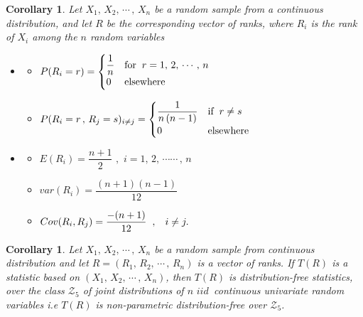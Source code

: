 \documentclass[12pt,a4paper]{report}
\theoremstyle{definition}
\theoremstyle{plain}
\newtheorem{coro}[thm]{Corollary}
\begin{document}
\begin{coro}
Let $X_1, \, X_2, \, \cdots\, , \, X_n$ be a random sample from a continuous distribution, and let $R$ be the corresponding vector of ranks, where $R_i$ is the rank of $X_i$  among the $n$ random variables
\begin{itemize}
\item[(a)]
\begin{itemize}
        \item[(i)] $P(R_i = r) = \begin{cases}
        \dfrac{1}{n} & \text{for}\hspace{0.2cm} r = 1, \, 2, \, \cdots\, , \, n\\
        0 & \text{elsewhere}
        \end{cases}$\\
        
        \item[(ii)] $P(R_i = r\, , \, R_j = s)_{i\neq j} = \begin{cases}
        \dfrac{1}{n\, (n - 1)} & \text{if}\hspace{0.2cm} r\neq s\\
        0 & \text{elsewhere}
        \end{cases}$\\
\end{itemize}

\item[(b)]
\begin{itemize}
           \item[(i)] $E(R_i) = \dfrac{n + 1}{2} \, \, , \,\, i = 1, \, 2, \, \cdots\cdots\, , \, n$
           
           \item[(ii)]$var(R_i) = \dfrac{(n + 1)(n-1)}{12}$
           
           \item[(iii)] $Cov(R_i, R_j) = \dfrac{-(n+1)}{12}\hspace{0.2cm}, \hspace{0.3cm} i \neq j.$\\
\end{itemize}
\end{itemize}
\end{coro}




\begin{coro}
Let $X_1, \, X_2,\, \cdots\, , \, X_n$ be a random sample from continuous distribution and let $R = (R_1, \, R_2, \, \cdots\, , \, R_n)$ is a vector of ranks. If $T(R)$ is a statistic based on $(X_1, \, X_2, \, \cdots\, , \, X_n)$, then $T(R)$  is distribution-free statistics, over the class $\mathscr{Z}_5$ of joint distributions of $n\,\, iid\,$ continuous univariate random variables i.e $T(R)$ is non-parametric distribution-free over $\mathscr{Z}_5$.
\end{coro}
\end{document}
